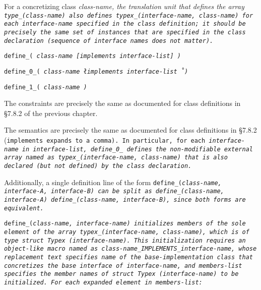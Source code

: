 For a concretizing class \it{class-name}, the translation unit that
defines the array \tt{type_(}\it{class-name}\tt{)} also defines
\tt{typex_(}\it{interface-name}\tt{,} \it{class-name}\tt{)} for each
\it{interface-name} specified in the class definition;
it should be precisely the same set of instances that are specified in
the class declaration (sequence of interface names does not matter).


\tt{define_}\s\s\s\tt{(} \it{class-name}
 [\tt{implements} \it{interface-list}]   \tt{)}

\tt{define_0_}\s\tt{(} \it{class-name}
\l\tt{implements} \it{interface-list}\r\ \tt{)}

\tt{define_1_}\s\tt{(} \it{class-name}   \tt{)}


The constraints are precisely the same as documented for
class definitions in \S 7.8.2 of the previous chapter.


The semantics are precisely the same as documented for class
definitions in \S 7.8.2 (\tt{implements} expands to a comma).
In particular, for each \it{interface-name} in \it{interface-list},
\tt{define_0_} defines the non-modifiable external array named as
\tt{typex_(}\it{interface-name}\tt{,} \it{class-name}\tt{)} that
is also declared (but not defined) by the class declaration.

Additionally, a single definition line of the form
\tt{define_(}\it{class-name}\tt{,} \it{interface-A}\tt{,} \it{interface-B}\tt{)}
can be split as \tt{define_(}\it{class-name}\tt{,} \it{interface-A}\tt{)}
\tt{define_(}\it{class-name}\tt{,} \it{interface-B}\tt{)},
since both forms are equivalent.

\tt{define_(}\it{class-name}\tt{,} \it{interface-name}\tt{)}
initializes members of the sole element of the array
\tt{typex_(}\it{interface-name}, \it{class-name}\tt{)},
which is of type \tt{struct Typex (}\it{interface-name}\tt{)}.
This initialization requires an object-like macro named as
\it{class-name}\tt{_IMPLEMENTS_}\it{interface-name}, whose replacement text
specifies name of the \it{base-implementation} class that concretizes the base
interface of \it{interface-name}, and \it{members-list} specifies the member
names of \tt{struct Typex (}\it{interface-name}\tt{)} to be initialized.
For each expanded element in \it{members-list}:

